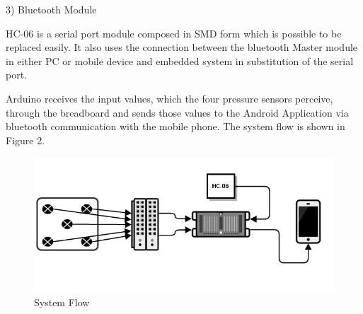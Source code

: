 \documentclass[conference]{IEEEtran}
\begin{document}
3)	Bluetooth Module

HC-06 is a serial port module composed in SMD form which is possible to be replaced easily. It also uses the connection between the bluetooth Master module in either PC or mobile device and embedded system in substitution of the serial port. 

Arduino receives the input values, which the four pressure sensors perceive, through the breadboard and sends those values to the Android Application via bluetooth communication with the mobile phone. The system flow is shown in Figure 2.\\

\begin{figure}[H]
\begin{center}
    \includegraphics[scale=0.4]{img_01.png}
    \caption{System Flow} 
\end{center}
\end{figure}
\end{document}
